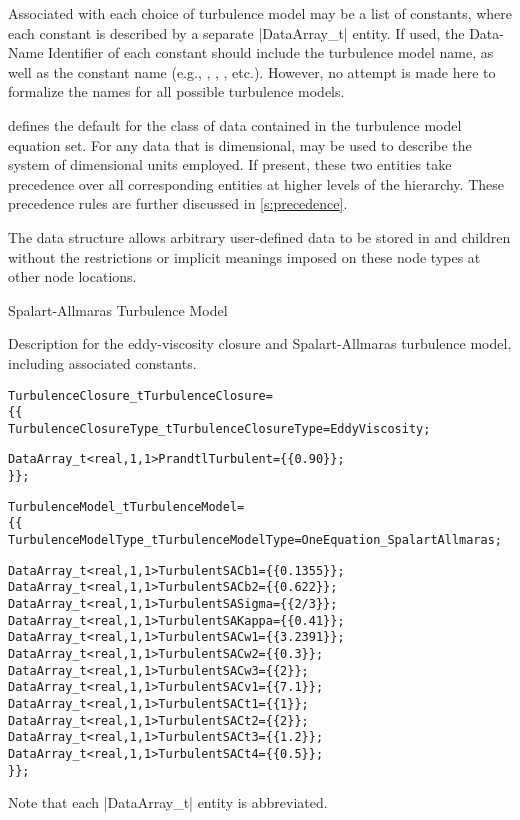 Associated with each choice of turbulence model may be a list of constants,
where each constant is described by a separate |DataArray_t| entity.
If used, the Data-Name Identifier of each constant should include the
turbulence model name, as well as the constant name (e.g.,
, , ,
etc.).
However, no attempt is made here to formalize the names for all possible
turbulence models.

 defines the default for the class of data contained in the
turbulence model equation set.
For any data that is dimensional,  may be used to
describe the system of dimensional units employed.
If present, these two entities take precedence over all corresponding
entities at higher levels of the hierarchy.
These precedence rules are further discussed in \autoref{s:precedence}.

The  data structure allows arbitrary
user-defined data to be stored in  and
 children without the restrictions or implicit
meanings imposed on these node types at other node locations.

\clearpage
\begin{example}{Spalart-Allmaras Turbulence Model}

Description for the eddy-viscosity closure and Spalart-Allmaras
turbulence model, including associated constants.
\begin{alltt}
  TurbulenceClosure\_t TurbulenceClosure =
    \{\{
    TurbulenceClosureType\_t TurbulenceClosureType = EddyViscosity ;

    DataArray\_t<real, 1, 1> PrandtlTurbulent = \{\{ 0.90 \}\} ;
    \}\} ;

  TurbulenceModel\_t TurbulenceModel = 
    \{\{
    TurbulenceModelType\_t TurbulenceModelType = OneEquation\_SpalartAllmaras ;

    DataArray\_t<real, 1, 1> TurbulentSACb1   = \{\{ 0.1355 \}\} ;
    DataArray\_t<real, 1, 1> TurbulentSACb2   = \{\{ 0.622 \}\} ;
    DataArray\_t<real, 1, 1> TurbulentSASigma = \{\{ 2/3 \}\} ;
    DataArray\_t<real, 1, 1> TurbulentSAKappa = \{\{ 0.41 \}\} ;
    DataArray\_t<real, 1, 1> TurbulentSACw1   = \{\{ 3.2391 \}\} ;
    DataArray\_t<real, 1, 1> TurbulentSACw2   = \{\{ 0.3 \}\} ;
    DataArray\_t<real, 1, 1> TurbulentSACw3   = \{\{ 2 \}\} ;
    DataArray\_t<real, 1, 1> TurbulentSACv1   = \{\{ 7.1 \}\} ;
    DataArray\_t<real, 1, 1> TurbulentSACt1   = \{\{ 1 \}\} ;
    DataArray\_t<real, 1, 1> TurbulentSACt2   = \{\{ 2 \}\} ;
    DataArray\_t<real, 1, 1> TurbulentSACt3   = \{\{ 1.2 \}\} ;
    DataArray\_t<real, 1, 1> TurbulentSACt4   = \{\{ 0.5 \}\} ;
    \}\} ;
\end{alltt}
Note that each |DataArray_t| entity is abbreviated.
\end{example}

